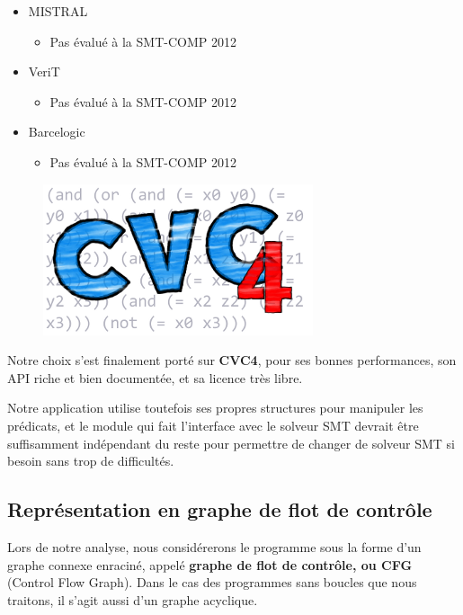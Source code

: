 \documentclass[french]{article}
\begin{document}
\begin{itemize}
\begin{itemize}
    \end{itemize}
    \item MISTRAL~\cite{smt_mistral}
    \begin{itemize}
      \item Pas évalué à la SMT-COMP 2012
    \end{itemize}
    \item VeriT~\cite{smt_verit}
    \begin{itemize}
      \item Pas évalué à la SMT-COMP 2012
    \end{itemize}
    \item Barcelogic~\cite{smt_barcelogic}
    \begin{itemize}
      \item Pas évalué à la SMT-COMP 2012
    \end{itemize}
  \end{itemize}

  \begin{figure}
    \centering
    \includegraphics{./pictures/cvc4.png}
    \label{cvc4}
  \end{figure}

  Notre choix s'est finalement porté sur \textbf{CVC4}, pour ses bonnes performances, son API riche et bien documentée, et sa licence très libre.

  Notre application utilise toutefois ses propres structures pour manipuler les prédicats, et le module qui fait l'interface avec le solveur SMT devrait être suffisamment indépendant du reste pour permettre de changer de solveur SMT si besoin sans trop de difficultés.

  \subsection{Représentation en graphe de flot de contrôle}
  Lors de notre analyse, nous considérerons le programme sous la forme d'un graphe connexe enraciné, appelé \textbf{graphe de flot de contrôle, ou CFG} (Control Flow Graph). Dans le cas des programmes sans boucles que nous traitons, il s'agit aussi d'un graphe acyclique.
\end{document}
